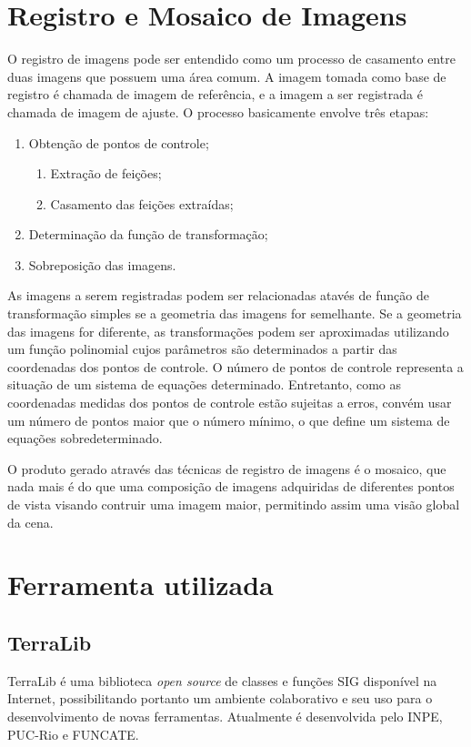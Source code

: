 \documentclass[9pt, a4paper, nofonttune, journal]{IEEEtran}
\begin{document}
\section{Registro e Mosaico de Imagens}
O registro de imagens pode ser entendido como um processo de casamento entre duas imagens que possuem uma área comum.
A imagem tomada como base de registro é chamada de imagem de referência, e a imagem a ser registrada é chamada de imagem de ajuste.
O processo basicamente envolve três etapas:
\begin{enumerate}
	\item Obtenção de pontos de controle;
	\begin{enumerate}
		\item Extração de feições;
		\item Casamento das feições extraídas;
	\end{enumerate}
	\item Determinação da função de transformação;
	\item Sobreposição das imagens.
\end{enumerate}

As imagens a serem registradas podem ser relacionadas atavés de função de transformação simples se a geometria das imagens for semelhante.
Se a geometria das imagens for diferente, as transformações podem ser aproximadas utilizando um função polinomial cujos parâmetros são determinados 
a partir das coordenadas dos pontos de controle.
O número de pontos de controle representa a situação de um sistema de equações determinado.
Entretanto, como as coordenadas medidas dos pontos de controle estão sujeitas a erros, convém usar um número de pontos maior que o número mínimo,
o que define um sistema de equações sobredeterminado.

O produto gerado através das técnicas de registro de imagens é o mosaico, que nada mais é do que uma 
composição de imagens adquiridas de diferentes pontos de vista visando contruir uma imagem maior, permitindo assim uma visão global da cena.\cite{Fedorov1}

\section{Ferramenta utilizada}

\subsection{TerraLib}
TerraLib é uma biblioteca \textit{open source} de classes e funções SIG disponível na Internet, possibilitando portanto um ambiente colaborativo e seu uso
para o desenvolvimento de novas ferramentas. Atualmente é desenvolvida pelo INPE, PUC-Rio e FUNCATE.\cite{Terralib1}
\end{document}
